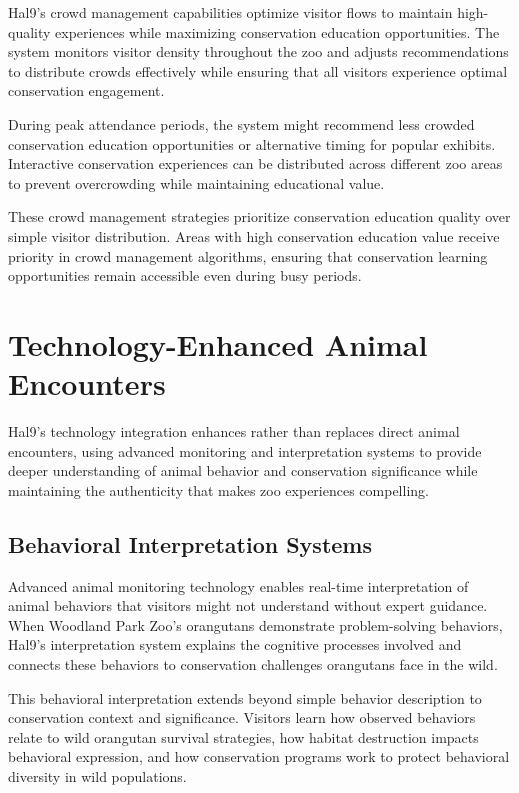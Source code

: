\documentclass[
  Letterpaper,
]{scrbook}
\begin{document}
Hal9's crowd management capabilities optimize visitor flows to maintain
high-quality experiences while maximizing conservation education
opportunities. The system monitors visitor density throughout the zoo
and adjusts recommendations to distribute crowds effectively while
ensuring that all visitors experience optimal conservation engagement.

During peak attendance periods, the system might recommend less crowded
conservation education opportunities or alternative timing for popular
exhibits. Interactive conservation experiences can be distributed across
different zoo areas to prevent overcrowding while maintaining
educational value.

These crowd management strategies prioritize conservation education
quality over simple visitor distribution. Areas with high conservation
education value receive priority in crowd management algorithms,
ensuring that conservation learning opportunities remain accessible even
during busy periods.

\section{Technology-Enhanced Animal
Encounters}\label{technology-enhanced-animal-encounters}

Hal9's technology integration enhances rather than replaces direct
animal encounters, using advanced monitoring and interpretation systems
to provide deeper understanding of animal behavior and conservation
significance while maintaining the authenticity that makes zoo
experiences compelling.

\subsection{Behavioral Interpretation
Systems}\label{behavioral-interpretation-systems}

Advanced animal monitoring technology enables real-time interpretation
of animal behaviors that visitors might not understand without expert
guidance. When Woodland Park Zoo's orangutans demonstrate
problem-solving behaviors, Hal9's interpretation system explains the
cognitive processes involved and connects these behaviors to
conservation challenges orangutans face in the wild.

This behavioral interpretation extends beyond simple behavior
description to conservation context and significance. Visitors learn how
observed behaviors relate to wild orangutan survival strategies, how
habitat destruction impacts behavioral expression, and how conservation
programs work to protect behavioral diversity in wild populations.
\end{document}

